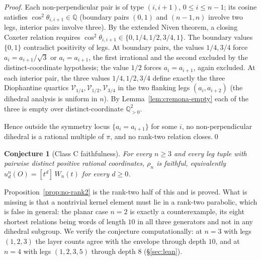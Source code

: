 \documentclass[11pt,a4paper]{article}
\newtheorem{conjecture}[theorem]{Conjecture}
\theoremstyle{remark}
\theoremstyle{plain}
\begin{document}
\begin{proof}
Each
non-perpendicular pair is of type $(i, i+1)$, $0 \le i \le n-1$;
its cosine satisfies $\cos^2 \theta_{i, i+1} \in \mathbb{Q}$
(boundary pairs $(0,1)$ and $(n-1,n)$ involve two legs, interior
pairs involve three).  By the extended Niven theorem, a closing
Coxeter relation requires
$\cos^2 \theta_{i, i+1} \in \{0, 1/4, 1/2, 3/4, 1\}$.  The boundary
values $\{0, 1\}$ contradict positivity of legs.  At boundary pairs,
the values $1/4, 3/4$ force $a_i = a_{i+1}/\sqrt 3$ or
$a_i = a_{i+1}$, the first irrational and the second excluded by
the distinct-coordinate hypothesis; the value $1/2$ forces
$a_i = a_{i+1}$, again excluded.  At each interior pair, the three
values $1/4, 1/2, 3/4$ define exactly the three Diophantine
quartics $\mathcal{V}_{1/4}, \mathcal{V}_{1/2}, \mathcal{V}_{3/4}$
in the two flanking legs $(a_i, a_{i+2})$ (the dihedral analysis is
uniform in $n$).  By Lemma~\ref{lem:cremona-empty} each of the
three is empty over distinct-coordinate $\mathbb{Q}_{>0}^2$.

Hence outside the symmetry locus $\{a_i = a_{i+1}\}$ for some $i$, no
non-perpendicular dihedral is a rational multiple of $\pi$, and no rank-two
relation closes.\qed
\end{proof}

\begin{conjecture}[Class C faithfulness]
\label{conj:master-C}
For every $n \ge 3$ and every leg tuple with pairwise distinct positive rational
coordinates, $\rho_n$ is faithful, equivalently
$u_d^n(O) = [t^d]\, W_n(t)$ for every $d \ge 0$.
\end{conjecture}

Proposition~\ref{prop:no-rank2} is the rank-two half of this and is proved. What
is missing is that a nontrivial kernel element must lie in a rank-two parabolic,
which is false in general: the planar case $n=2$ is exactly a counterexample,
its eight shortest relations being words of length $10$ in all three generators
and not in any dihedral subgroup. We verify the conjecture computationally:
at $n=3$ with legs $(1,2,3)$ the layer counts agree with the envelope through
depth $10$, and at $n=4$ with legs $(1,2,3,5)$ through depth $8$
(\S\ref{sec:lean}).
\end{document}
